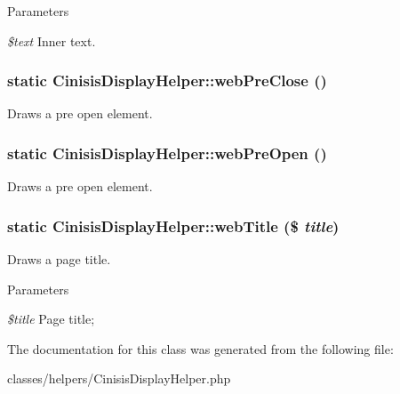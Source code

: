 \begin{DoxyParams}{Parameters}
\item[{\em \$text}]Inner text. \end{DoxyParams}
\hypertarget{classCinisisDisplayHelper_af4d61af3ed8211300032a208175d72ed}{
\subsubsection[{webPreClose}]{\setlength{\rightskip}{0pt plus 5cm}static CinisisDisplayHelper::webPreClose ()}}
\label{classCinisisDisplayHelper_af4d61af3ed8211300032a208175d72ed}
Draws a pre open element. \hypertarget{classCinisisDisplayHelper_a9c2a28e3865e8b3950b428770a132aa0}{
\subsubsection[{webPreOpen}]{\setlength{\rightskip}{0pt plus 5cm}static CinisisDisplayHelper::webPreOpen ()}}
\label{classCinisisDisplayHelper_a9c2a28e3865e8b3950b428770a132aa0}
Draws a pre open element. \hypertarget{classCinisisDisplayHelper_af3849efbba5e6980ddfdb4ceddb6ad17}{
\subsubsection[{webTitle}]{\setlength{\rightskip}{0pt plus 5cm}static CinisisDisplayHelper::webTitle (\$ {\em title})}}
\label{classCinisisDisplayHelper_af3849efbba5e6980ddfdb4ceddb6ad17}
Draws a page title.


\begin{DoxyParams}{Parameters}
\item[{\em \$title}]Page title; \end{DoxyParams}


The documentation for this class was generated from the following file:\begin{DoxyCompactItemize}
\item 
classes/helpers/CinisisDisplayHelper.php\end{DoxyCompactItemize}
